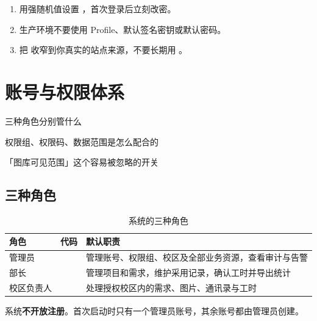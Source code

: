 \documentclass[cn,11pt,green]{elegantbook}
\begin{document}
\begin{warnbox}[首次上线务必做的三件事]
  \begin{enumerate}
    \item 用强随机值设置 ，首次登录后立刻改密。
    \item 生产环境不要使用  Profile、默认签名密钥或默认密码。
    \item 把  收窄到你真实的站点来源，不要长期用 \code{*}。
  \end{enumerate}
\end{warnbox}

\chapter{账号与权限体系}

\begin{introduction}
  \item 三种角色分别管什么
  \item 权限组、权限码、数据范围是怎么配合的
  \item 「图库可见范围」这个容易被忽略的开关
\end{introduction}

\section{三种角色}

\begin{table}[htbp]
  \centering
  \caption{系统的三种角色}
  \begin{tabular}{L{2.4cm} L{2.2cm} L{7.4cm}}
    \toprule
    \textbf{角色} & \textbf{代码} & \textbf{默认职责} \\
    \midrule
    管理员 &  & 管理账号、权限组、校区及全部业务资源，查看审计与告警 \\
    部长 &  & 管理项目和需求，维护采用记录，确认工时并导出统计 \\
    校区负责人 &  & 处理授权校区内的需求、图片、通讯录与工时 \\
    \bottomrule
  \end{tabular}
\end{table}

系统\textbf{不开放注册}。首次启动时只有一个管理员账号，其余账号都由管理员创建。
\end{document}
